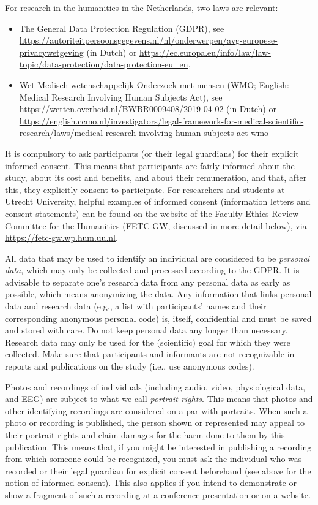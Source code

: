 \documentclass[
]{book}
\begin{document}
For research in the humanities in the Netherlands, two laws are relevant:

\begin{itemize}
\item
  The General Data Protection Regulation (GDPR), see \url{https://autoriteitpersoonsgegevens.nl/nl/onderwerpen/avg-europese-privacywetgeving} (in Dutch) or \url{https://ec.europa.eu/info/law/law-topic/data-protection/data-protection-eu_en},
\item
  Wet Medisch-wetenschappelijk Onderzoek met mensen (WMO; English: Medical Research Involving Human Subjects Act), see \url{https://wetten.overheid.nl/BWBR0009408/2019-04-02} (in Dutch) or \url{https://english.ccmo.nl/investigators/legal-framework-for-medical-scientific-research/laws/medical-research-involving-human-subjects-act-wmo}
\end{itemize}

It is compulsory to ask participants (or their legal guardians) for their explicit informed consent. This means that participants are fairly informed about the study, about its cost and benefits, and about their remuneration, and that, after this, they explicitly consent to participate. For researchers and students at Utrecht University, helpful examples of informed consent (information letters and consent statements) can be found on the website of the Faculty Ethics Review Committee for the Humanities (FETC-GW, discussed in more detail below), via \url{https://fetc-gw.wp.hum.uu.nl}.

All data that may be used to identify an individual are considered to be \emph{personal data}, which may only be collected and processed according to the GDPR. It is advisable to separate one's research data from any personal data as early as possible, which means anonymizing the data. Any information that links personal data and research data (e.g., a list with participants' names and their corresponding anonymous personal code) is, itself, confidential and must be saved and stored with care. Do not keep personal data any longer than necessary. Research data may only be used for the (scientific) goal for which they were collected. Make sure that participants and informants are not recognizable in reports and publications on the study (i.e., use anonymous codes).

Photos and recordings of individuals (including audio, video, physiological data, and EEG) are subject to what we call \emph{portrait rights}. This means that photos and other identifying recordings are considered on a par with portraits. When such a photo or recording is published, the person shown or represented may appeal to their portrait rights and claim damages for the harm done to them by this publication. This means that, if you might be interested in publishing a recording from which someone could be recognized, you must ask the individual who was recorded or their legal guardian for explicit consent beforehand (see above for the notion of informed consent). This also applies if you intend to demonstrate or show a fragment of such a recording at a conference presentation or on a website.
\end{document}
